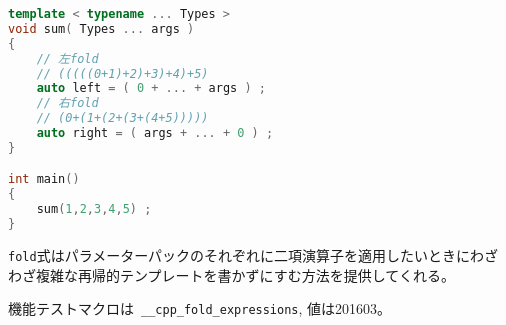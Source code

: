 \begin{lstlisting}[language=C++]
template < typename ... Types >
void sum( Types ... args )
{
    // 左fold
    // (((((0+1)+2)+3)+4)+5)
    auto left = ( 0 + ... + args ) ;
    // 右fold
    // (0+(1+(2+(3+(4+5)))))
    auto right = ( args + ... + 0 ) ;
}

int main()
{
    sum(1,2,3,4,5) ;
}
\end{lstlisting}

\lstinline!fold!式はパラメーターパックのそれぞれに二項演算子を適用したいときにわざわざ複雑な再帰的テンプレートを書かずにすむ方法を提供してくれる。

機能テストマクロは~\lstinline!__cpp_fold_expressions!, 値は201603。
